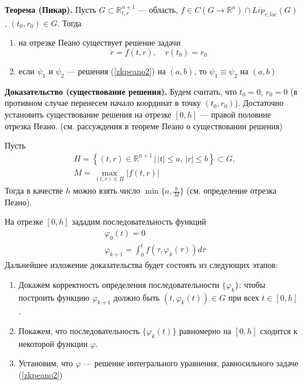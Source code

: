 \textbf{Теорема (Пикар).} Пусть $G \subset \mathbb{R}_{t,r}^{n+1}$ --- область, $f \in C(G \to \mathbb{R}^n) \cap Lip_{r,loc}(G)$, $(t_0, r_0) \in G$. Тогда
\begin{enumerate}
    \item на отрезке Пеано существует решение задачи
    \begin{equation}
        \dot{r} = f(t,r), \quad r(t_0) = r_0 \label{zkpeano2}
    \end{equation}
    \item если $\psi_1$ и $\psi_2$ --- решения (\ref{zkpeano2}) на $(a,b)$, то $\psi_1 \equiv \psi_2$ на $(a,b)$
\end{enumerate}
\textbf{Доказательство (существование решения).} Будем считать, что $t_0 = 0$, $r_0 = 0$ (в противном случае перенесем начало координат в точку $(t_0, r_0)$). Достаточно установить существование решения на отрезке $[0, h]$ --- правой половине отрезка Пеано. (см. рассуждения в теореме Пеано о существовании решения)

Пусть
\begin{equation*}
    \begin{aligned}
        &\Pi = \left\{(t,r) \in \mathbb{R}^{n + 1}\,|\, |t| \le a,\, |r| \le b\right\} \subset G,\\
        &M = \max_{(t,r) \in \Pi} |f(t,r)|
    \end{aligned}
\end{equation*}
Тогда в качестве $h$ можно взять число $\min \{a, \frac{b}{M}\}$ (см. определение отрезка Пеано).

На отрезке $[0,h]$ зададим последовательность функций
\begin{equation*}
    \begin{aligned}
        &\varphi_0(t) = 0\\
        &\varphi_{k+1} = \int_0^t f(\tau, \varphi_k(\tau))d\tau
    \end{aligned}
\end{equation*}
Дальнейшее изложение доказательства будет состоять из следующих этапов:
\begin{enumerate}
    \item Докажем корректность определения последовательности $\{\varphi_k\}$: чтобы построить функцию $\varphi_{k+1}$ должно быть $(t, \varphi_k(t)) \in G$ при всех $t \in [0,h]$.
    \item Покажем, что последовательность $\{\varphi_k(t)\}$ равномерно на $[0,h]$ сходится к некоторой функции $\varphi$.
    \item Установим, что $\varphi$ --- решение интегрального уравнения, равносильного задаче (\ref{zkpeano2})
\end{enumerate}

